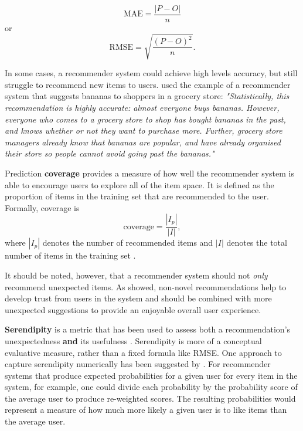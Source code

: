 \begin{equation}
    \text{MAE} = \dfrac{|P - O|}{n}
\end{equation}
or
\begin{equation}
    \text{RMSE} = \sqrt{\dfrac{(P - O)^{2}}{n}}.
\end{equation}

In some cases, a recommender system could achieve high levels accuracy, but still struggle to recommend new items to users. \cite{eval_colab} used the example of a recommender system that suggests bananas to shoppers in a grocery store: \textit{"Statistically, this recommendation is highly accurate: almost everyone buys bananas. However, everyone who comes to a grocery store to shop has bought bananas in the past, and knows whether or not they want to purchase more. Further, grocery store managers already know that bananas are popular, and have already organised their store so people cannot avoid going past the bananas."}

Prediction \textbf{coverage} provides a measure of how well the recommender system is able to encourage users to explore all of the item space. It is defined as the proportion of items in the training set that are recommended to the user. Formally, coverage is 
\begin{equation} \label{eqn:cov}
    \text{coverage} = \dfrac{|I_p|}{|I|},
\end{equation}
where $|I_p|$ denotes the number of recommended items and $|I|$ denotes the total number of items in the training set \parencite{eval_coverage}.

It should be noted, however, that a recommender system should not \textit{only} recommend unexpected items. As \cite{swearingen2001beyondalgorithms} showed, non-novel recommendations help to develop trust from users in the system and should be combined with more unexpected suggestions to provide an enjoyable overall user experience.

\textbf{Serendipity} is a metric that has been used to assess both a recommendation's unexpectedness \textbf{and} its usefulness \parencite{online_predicting}. Serendipity is more of a conceptual evaluative measure, rather than a fixed formula like RMSE. One approach to capture serendipity numerically has been suggested by \parencite{eval_colab}. For recommender systems that produce expected probabilities for a given user for every item in the system, for example, one could divide each probability by the probability score of the average user to produce re-weighted scores. The resulting probabilities would represent a measure of how much more likely a given user is to like items than the average user.

